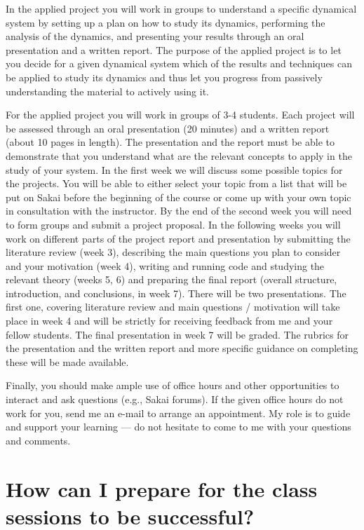 \documentclass[11pt]{article}
\begin{document}
In the applied project you will work in groups to understand a specific dynamical system by setting up a plan on how to study its dynamics, performing the analysis of the dynamics, and presenting your results through an oral presentation and a written report. The purpose of the applied project is to let you decide for a given dynamical system which of the results and techniques can be applied to study its dynamics and thus let you progress from passively understanding the material to actively using it. 

For the applied project you will work in groups of 3-4 students. Each project will be assessed through an oral presentation (20 minutes) and a written report (about 10 pages in length). The presentation and the report must be able to demonstrate that you understand what are the relevant concepts to apply in the study of your system.  In the first week we will discuss some possible topics for the projects. You will be able to either select your topic from a list that will be put on Sakai before the beginning of the course or come up with your own topic in consultation with the instructor. By the end of the second week you will need to form groups and submit a project proposal. In the following weeks you will work on different parts of the project report and presentation by submitting the literature review (week 3), describing the main questions you plan to consider and your motivation (week 4), writing and running code and studying the relevant theory (weeks 5, 6) and preparing the final report (overall structure, introduction, and conclusions, in week 7). There will be two presentations. The first one, covering literature review and main questions / motivation will take place in week 4 and will be strictly for receiving feedback from me and your fellow students. The final presentation in week 7 will be graded. The rubrics for the presentation and the written report and more specific guidance on completing these will be made available.

Finally, you should make ample use of office hours and other opportunities to interact and ask questions (e.g., Sakai forums). If the given office hours do not work for you, send me an e-mail to arrange an appointment. My role is to guide and support your learning — do not hesitate to come to me with your questions and comments.


\section{How can I prepare for the class sessions to be successful?}
\end{document}
